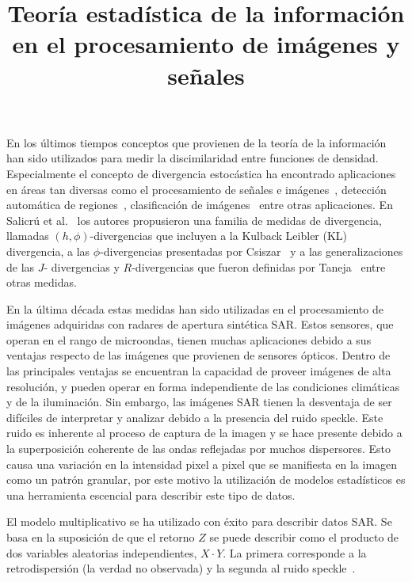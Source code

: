 \documentclass[11pt]{article}
\title{\textbf{Teoría estadística de la información \\en el procesamiento de imágenes y señales}}
\date{}
\begin{document}
	
	\maketitle

En los últimos tiempos conceptos que provienen de la teoría de la información han sido utilizados para medir la discimilaridad entre funciones de densidad. Especialmente el concepto de divergencia estocástica ha encontrado aplicaciones en áreas tan diversas como el procesamiento de señales e imágenes~\cite {Aviyente2007}, detección automática de regiones~\cite{SilvaCribariFrery:ImprovedLikelihood:Environmetrics, Nascimento2009}, clasificación de imágenes~\cite{Puig2003} entre otras aplicaciones. 
En Salicrú et al.~\cite{Salicru1994} los autores propusieron una familia de medidas de divergencia, llamadas $(h,\phi)$-divergencias que incluyen a la Kulback Leibler (KL) divergencia, a las $\phi$-divergencias presentadas por Csiszar~\cite{Csiszar1967} y a las generalizaciones de las $J$- divergencias y $R$-divergencias que fueron definidas por Taneja~\cite{Taneja1989} entre otras medidas. 

En la última década estas medidas han sido utilizadas en el procesamiento de imágenes adquiridas con radares de apertura sintética SAR. Estos sensores, que operan en el rango de microondas, tienen muchas aplicaciones debido a sus ventajas respecto de las imágenes que provienen de sensores ópticos. Dentro de las principales ventajas se encuentran la capacidad de proveer imágenes de alta resolución, y pueden operar en forma independiente de las condiciones climáticas y de la iluminación. Sin embargo, las imágenes SAR tienen la desventaja de ser difíciles de interpretar y analizar debido a la presencia del ruido speckle. Este ruido es inherente al proceso de captura de la imagen y se hace presente debido a la superposición coherente de las ondas reflejadas por
muchos dispersores. Esto causa una variación en la intensidad pixel a pixel que se manifiesta en la imagen como un patrón granular, por este motivo la utilización de modelos estadísticos es una herramienta escencial para describir este tipo de datos.

El modelo multiplicativo se ha utilizado con éxito para describir datos SAR. Se basa en la suposición de que el retorno $Z$ se puede describir como el producto de dos variables aleatorias independientes, $X\cdot Y$. La primera corresponde a la retrodispersión (la verdad no observada) y la segunda al ruido speckle~\cite{oliverquegan98}.
\end{document}
